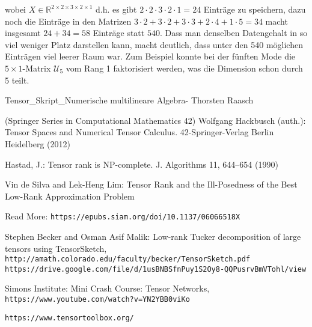 \documentclass[11pt]{article} %
\theoremstyle{definition}
\numberwithin{equation}{section}
\begin{document}
\begin{changemargin}{0pt}{0pt}
wobei $X \in \mathbb{R}^{2\times 2\times 3\times 2\times 1}$ d.h. es gibt $2\cdot 2\cdot 3\cdot 2\cdot 1 = 24$ Einträge zu speichern,
dazu noch die Einträge in den Matrizen $3\cdot2 + 3\cdot2 + 3\cdot3 + 2\cdot4 +1\cdot5 = 34$ macht insgesamt $24+34=58$ Einträge
statt $540$. Dass man denselben Datengehalt in so viel weniger Platz darstellen kann, macht deutlich, dass unter den 
540 möglichen Einträgen viel leerer Raum war. Zum Beispiel konnte bei der fünften Mode die $5 \times 1$-Matrix 
$\mathcal{U}_{5}$ vom Rang 1 faktorisiert werden, was die Dimension schon durch 5 teilt.


\end{changemargin}

\newpage

\begin{thebibliography}{9}
Tensor\_Skript\_Numerische multilineare Algebra- Thorsten Raasch

(Springer Series in Computational Mathematics 42) Wolfgang Hackbusch (auth.):
Tensor Spaces and Numerical Tensor Calculus. 42-Springer-Verlag Berlin Heidelberg (2012)

Hastad, J.: Tensor rank is NP-complete. J. Algorithms 11, 644–654 (1990)

Vin de Silva and Lek-Heng Lim:
Tensor Rank and the Ill-Posedness of the Best Low-Rank Approximation Problem

Read More: \texttt{https://epubs.siam.org/doi/10.1137/06066518X}

Stephen Becker and  Osman Asif Malik: Low-rank Tucker decomposition of large tensors using
TensorSketch,
\\\texttt{http://amath.colorado.edu/faculty/becker/TensorSketch.pdf}
\\\texttt{https://drive.google.com/file/d/1usBNBSfnPuy1S2Oy8-QQPusrvBmVTohl/view}

Simons Institute: Mini Crash Course: Tensor Networks,
\\\texttt{https://www.youtube.com/watch?v=YN2YBB0viKo}

\texttt{https://www.tensortoolbox.org/}

\end{thebibliography}
\end{document}
